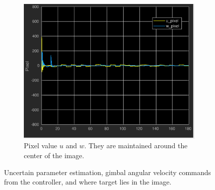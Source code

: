 \begin{figure}[htbp]
\begin{subfigure}{0.5\textwidth}
		\includegraphics[width=\linewidth]{images/chapter2/uav_pixel}
		\caption{Pixel value $u$ and $w$. They are maintained around the center of the image.}
	\end{subfigure}	
	\caption{Uncertain parameter estimation, gimbal angular velocity commands from the controller, and where target lies in the image.}
	\label{uav_adaptive_additional}
\end{figure}

